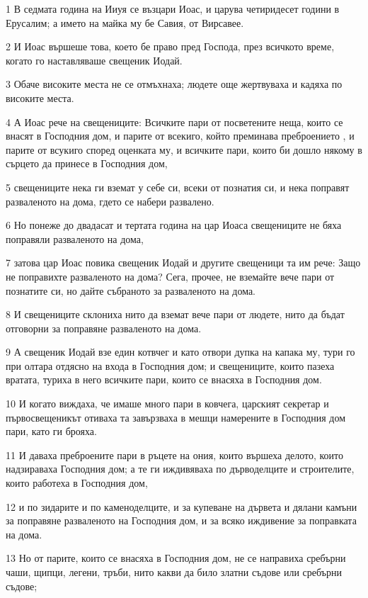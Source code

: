 \par 1 В седмата година на Ииуя се възцари Иоас, и царува четиридесет години в Ерусалим; а името на майка му бе Савия, от Вирсавее.
\par 2 И Иоас вършеше това, което бе право пред Господа, през всичкото време, когато го наставляваше свещеник Иодай.
\par 3 Обаче високите места не се отмъхнаха; людете още жертвуваха и кадяха по високите места.
\par 4 А Иоас рече на свещениците: Всичките пари от посветените неща, които се внасят в Господния дом, и парите от всекиго, който преминава преброението , и парите от всукиго според оценката му, и всичките пари, които би дошло някому в сърцето да принесе в Господния дом,
\par 5 свещениците нека ги вземат у себе си, всеки от познатия си, и нека поправят разваленото на дома, гдето се набери развалено.
\par 6 Но понеже до двадасат и тертата година на цар Иоаса свещениците не бяха поправяли разваленото на дома,
\par 7 затова цар Иоас повика свещеник Иодай и другите свещеници та им рече: Защо не поправихте разваленото на дома? Сега, прочее, не вземайте вече пари от познатите си, но дайте събраното за разваленото на дома.
\par 8 И свещениците склониха нито да вземат вече пари от людете, нито да бъдат отговорни за поправяне разваленото на дома.
\par 9 А свещеник Иодай взе един котвчег и като отвори дупка на капака му, тури го при олтара отдясно на входа в Господния дом; и свещениците, които пазеха вратата, туриха в него всичките пари, които се внасяха в Господния дом.
\par 10 И когато виждаха, че имаше много пари в ковчега, царският секретар и първосвещеникът отиваха та завързваха в мешци намерените в Господния дом пари, като ги брояха.
\par 11 И даваха преброените пари в ръцете на ония, които вършеха делото, които надзираваха Господния дом; а те ги иждивяваха по дърводелците и строителите, които работеха в Господния дом,
\par 12 и по зидарите и по каменоделците, и за купеване на дървета и дялани камъни за поправяне разваленото на Господния дом, и за всяко иждивение за поправката на дома.
\par 13 Но от парите, които се внасяха в Господния дом, не се направиха сребърни чаши, щипци, легени, тръби, нито какви да било златни съдове или сребърни съдове;
